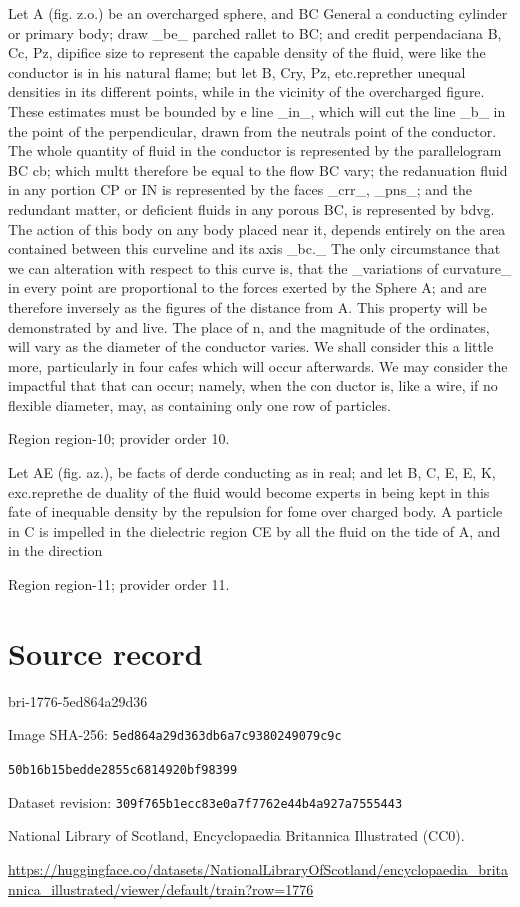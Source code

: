 \documentclass[11pt]{article}
\begin{document}
Let A (fig. z.o.) be an overcharged sphere, and BC General a conducting cylinder or primary body; draw \_be\_ parched rallet to BC; and credit perpendaciana B, Cc, Pz, dipifice size to represent the capable density of the fluid, were like the conductor is in his natural flame; but let B, Cry, Pz, etc.reprether unequal densities in its different points, while in the vicinity of the overcharged figure. These estimates must be bounded by e line \_in\_, which will cut the line \_b\_ in the point of the perpendicular, drawn from the neutrals point of the conductor. The whole quantity of fluid in the conductor is represented by the parallelogram BC cb; which multt therefore be equal to the flow BC vary; the redanuation fluid in any portion CP or IN is represented by the faces \_crr\_, \_pns\_; and the redundant matter, or deficient fluids in any porous BC, is represented by bdvg. The action of this body on any body placed near it, depends entirely on the area contained between this curveline and its axis \_bc.\_ The only circumstance that we can alteration with respect to this curve is, that the \_variations of curvature\_ in every point are proportional to the forces exerted by the Sphere A; and are therefore inversely as the figures of the distance from A. This property will be demonstrated by and live. The place of n, and the magnitude of the ordinates, will vary as the diameter of the conductor varies. We shall consider this a little more, particularly in four cafes which will occur afterwards. We may consider the impactful that that can occur; namely, when the con ductor is, like a wire, if no flexible diameter, may, as containing only one row of particles.
\par

{\scriptsize\color{gray} Region region-10; provider order 10.\par}
\medskip

Let AE (fig. az.), be facts of derde conducting as in real; and let B, C, E, E, K, exc.reprethe de duality of the fluid would become experts in being kept in this fate of inequable density by the repulsion for fome over charged body. A particle in C is impelled in the dielectric region CE by all the fluid on the tide of A, and in the direction
\par

{\scriptsize\color{gray} Region region-11; provider order 11.\par}
\medskip
\newpage\section*{Source record}
bri-1776-5ed864a29d36\par
Image SHA-256: \texttt{5ed864a29d363db6a7c9380249079c9c}\par\texttt{50b16b15bedde2855c6814920bf98399}\par
Dataset revision: \texttt{309f765b1ecc83e0a7f7}\texttt{762e44b4a927a7555443}\par
National Library of Scotland, Encyclopaedia Britannica Illustrated (CC0).\par
\url{https://huggingface.co/datasets/NationalLibraryOfScotland/encyclopaedia_britannica_illustrated/viewer/default/train?row=1776}
\end{document}
